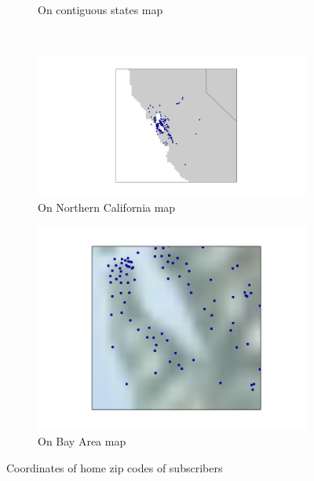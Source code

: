 \documentclass{article}
\begin{document}
\begin{figure}
\begin{subfigure}[b]{0.5\textwidth}
                \caption{On contiguous states map}
                \label{fig:homezips:usa}
        \end{subfigure}
        ~ %
        \begin{subfigure}[b]{0.4\textwidth}
                \includegraphics[width=\textwidth]{../home_zips_norcal.png}
                \caption{On Northern California map}
                \label{fig:homezips:norcal}
        \end{subfigure}
        \begin{subfigure}[b]{0.4\textwidth}
                \includegraphics[width=\textwidth]{../home_zips_bay_area.png}
                \caption{On Bay Area map}
                \label{fig:homezips:}
        \end{subfigure}
        \caption{Coordinates of home zip codes of subscribers}
        \label{fig:homezips}
\end{figure}
\end{document}
